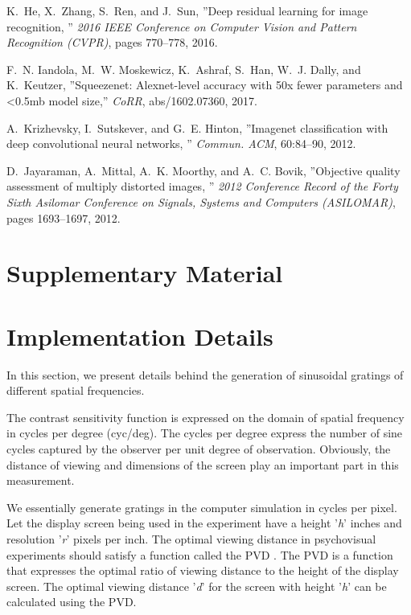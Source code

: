 \documentclass[10pt,twocolumn,letterpaper]{article}
\begin{document}
{\begin{thebibliography}{10}
K.~He, X.~Zhang, S.~Ren, and J.~Sun, ''Deep residual learning for image recognition, '' \emph{2016 IEEE     Conference on Computer Vision and Pattern Recognition
  (CVPR)}, pages 770--778, 2016.

F.~N. Iandola, M.~W. Moskewicz, K.~Ashraf, S.~Han, W.~J. Dally, and K.~Keutzer, ''Squeezenet:          Alexnet-level accuracy with 50x fewer parameters and
 <0.5mb model size,'' \emph{CoRR}, abs/1602.07360, 2017.

A.~Krizhevsky, I.~Sutskever, and G.~E. Hinton, ''Imagenet classification with deep convolutional neural networks, '' \emph{Commun. ACM}, 60:84--90, 2012.

D.~Jayaraman, A.~Mittal, A.~K. Moorthy, and A.~C. Bovik, ''Objective quality assessment of multiply distorted images, '' \emph{2012 Conference Record of the Forty Sixth Asilomar Conference on
  Signals, Systems and Computers (ASILOMAR)}, pages 1693--1697, 2012.

\end{thebibliography}}

\appendix
\section{Supplementary Material}
\section{Implementation Details}
In this section, we present details behind the generation of sinusoidal gratings of different spatial frequencies.

The contrast sensitivity function is expressed on the domain of spatial frequency in cycles per degree (cyc/deg). The cycles per degree express the number of sine cycles captured by the observer per unit degree of observation. Obviously, the distance of viewing and dimensions of the screen play an important part in this measurement.

We essentially generate gratings in the computer simulation in cycles per pixel. Let the display screen being used in the experiment have a height '\textit{h}' inches and resolution '\textit{r}' pixels per inch. The optimal viewing distance in psychovisual experiments should satisfy a function called the PVD \cite{1}. The PVD is a function that expresses the optimal ratio of viewing distance to the height of the display screen. The optimal viewing distance '\textit{d}' for the screen with height '\textit{h}' can be calculated using the PVD.
\end{document}
